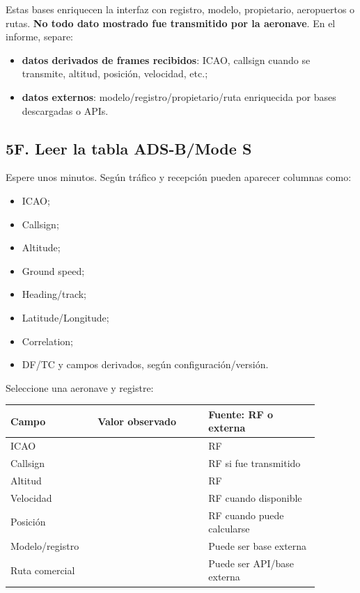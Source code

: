 Estas bases enriquecen la interfaz con registro, modelo, propietario, aeropuertos o rutas. \textbf{No todo dato mostrado fue transmitido por la aeronave}. En el informe, separe:

\begin{itemize}
    \item \textbf{datos derivados de frames recibidos}: ICAO, callsign cuando se transmite, altitud, posición, velocidad, etc.;
    \item \textbf{datos externos}: modelo/registro/propietario/ruta enriquecida por bases descargadas o APIs.
\end{itemize}

\subsection{5F. Leer la tabla ADS-B/Mode S}

Espere unos minutos. Según tráfico y recepción pueden aparecer columnas como:

\begin{itemize}
    \item ICAO;
    \item Callsign;
    \item Altitude;
    \item Ground speed;
    \item Heading/track;
    \item Latitude/Longitude;
    \item Correlation;
    \item DF/TC y campos derivados, según configuración/versión.
\end{itemize}

Seleccione una aeronave y registre:

\begin{longtable}{@{}p{0.24\linewidth}p{0.32\linewidth}p{0.32\linewidth}@{}}
\toprule
Campo & Valor observado & Fuente: RF o externa \\
\midrule
\endhead
ICAO & & RF \\
Callsign & & RF si fue transmitido \\
Altitud & & RF \\
Velocidad & & RF cuando disponible \\
Posición & & RF cuando puede calcularse \\
Modelo/registro & & Puede ser base externa \\
Ruta comercial & & Puede ser API/base externa \\
\bottomrule
\end{longtable}

